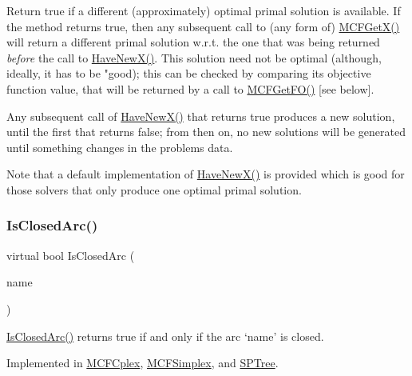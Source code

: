 Return true if a different (approximately) optimal primal solution is available. If the method returns true, then any subsequent call to (any form of) \mbox{\hyperlink{class_m_c_f_class_a4eb307e0707adaef99bb0e08c9e10eb8}{M\+C\+F\+Get\+X()}} will return a different primal solution w.\+r.\+t. the one that was being returned {\itshape before} the call to \mbox{\hyperlink{class_m_c_f_class_a7a4966a98c7ffa909057064beb4507a5}{Have\+New\+X()}}. This solution need not be optimal (although, ideally, it has to be "good); this can be checked by comparing its objective function value, that will be returned by a call to \mbox{\hyperlink{class_m_c_f_class_a109d7c021feda837d8ca5051fc24b6ea}{M\+C\+F\+Get\+F\+O()}} \mbox{[}see below\mbox{]}.

Any subsequent call of \mbox{\hyperlink{class_m_c_f_class_a7a4966a98c7ffa909057064beb4507a5}{Have\+New\+X()}} that returns true produces a new solution, until the first that returns false; from then on, no new solutions will be generated until something changes in the problem\textquotesingle{}s data.

Note that a default implementation of \mbox{\hyperlink{class_m_c_f_class_a7a4966a98c7ffa909057064beb4507a5}{Have\+New\+X()}} is provided which is good for those solvers that only produce one optimal primal solution. \mbox{\label{class_m_c_f_class_a2db08ae33bcdb997677a69f36c60c1e5}} 
\subsubsection{\texorpdfstring{Is\+Closed\+Arc()}{IsClosedArc()}}
{\footnotesize\ttfamily virtual bool Is\+Closed\+Arc (\begin{DoxyParamCaption}\item[{\mbox{\hyperlink{class_m_c_f_class_a76aaabb20535c51a2752b93f6c38fe54}{c\+Index}}}]{name }\end{DoxyParamCaption})\hspace{0.3cm}{\ttfamily [pure virtual]}}

\mbox{\hyperlink{class_m_c_f_class_a2db08ae33bcdb997677a69f36c60c1e5}{Is\+Closed\+Arc()}} returns true if and only if the arc `name' is closed. 

Implemented in \mbox{\hyperlink{class_m_c_f_cplex_a95d97fdf20e0075a8deda52f4925072a}{M\+C\+F\+Cplex}}, \mbox{\hyperlink{class_m_c_f_simplex_a95d97fdf20e0075a8deda52f4925072a}{M\+C\+F\+Simplex}}, and \mbox{\hyperlink{class_s_p_tree_a95d97fdf20e0075a8deda52f4925072a}{S\+P\+Tree}}.

